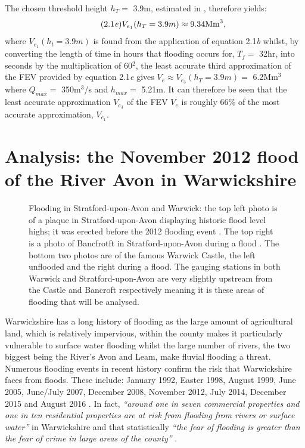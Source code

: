 \documentclass[11pt,a4paper]{article}
\begin{document}
The chosen threshold height $h_T=$ 3.9m, estimated in \cite{Aire}, therefore yields:
\begin{equation}\tag{2.1\textit{e}}
V_{e_1}(h_T=3.9m)\approx 9.34\text{Mm}^3,
\end{equation}
where $V_{e_1}(h_t=3.9m)$ is found from the application of equation 2.1\textit{b} whilst, by converting the length of time in hours that flooding occurs for, $T_f=$ 32hr, into seconds by the multiplication of 60$^2$, the least accurate third approximation of the FEV provided by equation 2.1\textit{e} gives $V_e\approx V_{e_3}(h_T=3.9m)=$ 6.2Mm$^3$ where $Q_{max}=$ 350m$^3$/s and $h_{max}=$ 5.21m. It can therefore be seen that the least accurate approximation $V_{e_3}$ of the FEV $V_e$ is roughly 66\% of the most accurate approximation, $V_{e_1}$.

\section{Analysis: the November 2012 flood of the River Avon in Warwickshire}
\begin{figure}[ht!]
\centering
{}
\hfill
{}
\caption{Flooding in Stratford-upon-Avon and Warwick: the top left photo is of a plaque in Stratford-upon-Avon displaying historic flood level highs{;} it was erected before the 2012 flooding event \cite{plaque}. The top right is a photo of Bancfrotft in Stratford-upon-Avon during a flood \cite{strat-flood}. The bottom two photos are of the famous Warwick Castle, the left \cite{castle} unflooded and the right \cite{warwick-flooding} during a flood. The gauging stations in both Warwick and Stratford-upon-Avon are very slightly upstream from the Castle and Bancroft respectively meaning it is these areas of flooding that will be analysed.}
\end{figure}

Warwickshire has a long history of flooding as the large amount of agricultural land, which is relatively impervious, within the county makes it particularly vulnerable to surface water flooding whilst the large number of rivers, the two biggest being the River's Avon and Leam, make fluvial flooding a threat. Numerous flooding events in recent history confirm the risk that Warwickshire faces from floods. These include: January 1992, Easter 1998, August 1999, June 2005, June/July 2007, December 2008, November 2012, July 2014, December 2015 and August 2016 \cite{war2}. In fact, \textit{``around one in seven commercial properties and one in ten residential properties are at risk from flooding from rivers or surface water''} \cite{war1} in Warwickshire and that statistically \textit{``the fear of flooding is greater than the fear of crime in large areas of the county''} \cite{war1}. 
\end{document}
